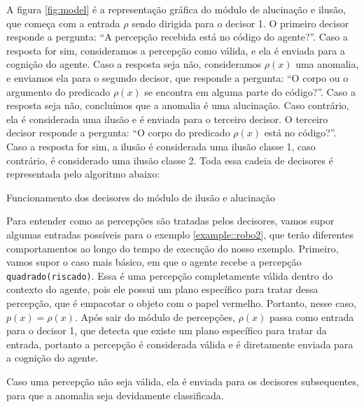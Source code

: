  A figura \ref{fig:model} é a representação gráfica do módulo de alucinação e ilusão, que começa com a entrada $\rho$ sendo dirigida para o decisor 1. O primeiro decisor responde a pergunta: ``A percepção recebida está no código do agente?''. Caso a resposta for sim, consideramos a percepção como válida, e ela é enviada para a cognição do agente. Caso a resposta seja não, consideramos $\rho(x)$ uma anomalia, e enviamos ela para o segundo decisor, que responde a pergunta: ``O corpo ou o argumento do predicado $\rho(x)$ se encontra em alguma parte do código?''. Caso a resposta seja não, concluímos que a anomalia é uma alucinação. Caso contrário, ela é considerada uma ilusão e é enviada para o terceiro decisor. O terceiro decisor responde a pergunta: ``O corpo do predicado $\rho(x)$ está no código?''. Caso a resposta for sim, a ilusão é considerada uma ilusão classe 1, caso contrário, é considerado uma ilusão classe 2. Toda essa cadeia de decisores é representada pelo algoritmo abaixo:

\begin{algorithm}[H]

 \label{algorithm:decisor}
 \caption{Funcionamento dos decisores do módulo de ilusão e alucinação}
 \label{alg::selection}
\end{algorithm}

\begin{example}
    Para entender como as percepções são tratadas pelos decisores, vamos supor algumas entradas possíveis para o exemplo \ref{example::robo2}, que terão diferentes comportamentos ao longo do tempo de execução do nosso exemplo. Primeiro, vamos supor o caso mais básico, em que o agente recebe a percepção \texttt{quadrado(riscado)}. Essa é uma percepção completamente válida dentro do contexto do agente, pois ele possui um plano específico para tratar dessa percepção, que é empacotar o objeto com o papel vermelho. Portanto, nesse caso, $p(x) = \rho(x)$. Após sair do módulo de percepções, $\rho(x)$ passa como entrada para o decisor 1, que detecta que existe um plano específico para tratar da entrada, portanto a percepção é considerada válida e é diretamente enviada para a cognição do agente.

    Caso uma percepção não seja válida, ela é enviada para os decisores subsequentes, para que a anomalia seja devidamente classificada. 
\end{example}{}

